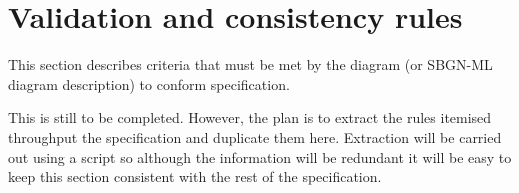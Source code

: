 \chapter{Validation and consistency rules}

\newcommand{\validationRule}     [1]{\item[#1.~]}

This section describes criteria that must be met by the diagram (or SBGN-ML diagram description) to conform
\SBGNPDLone specification. 

This is still to be completed. However, the plan is to extract the
rules itemised throughput the specification and duplicate them
here. Extraction will be carried out using a script so although the
information will be redundant it will be easy to keep this section
consistent with the rest of the specification.


